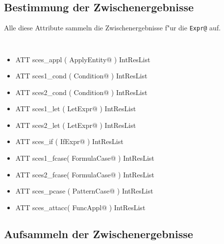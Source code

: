 \subsection{Bestimmung der Zwischenergebnisse}

Alle diese Attribute sammeln die Zwischenergebnisse f"ur die {\tt Expr@} auf.

{\tt
\begin{itemize}
\item ATT  sces\_appl  ( ApplyEntity@ ) IntResList 
\item ATT  sces1\_cond ( Condition@   ) IntResList 
\item ATT  sces2\_cond ( Condition@   ) IntResList 
\item ATT  sces1\_let  ( LetExpr@     ) IntResList 
\item ATT  sces2\_let  ( LetExpr@     ) IntResList 
\item ATT  sces\_if    ( IfExpr@      ) IntResList 
\item ATT  sces1\_fcase( FormulaCase@ ) IntResList 
\item ATT  sces2\_fcase( FormulaCase@ ) IntResList 
\item ATT  sces\_pcase ( PatternCase@ ) IntResList 
\item ATT  sces\_attacc( FuncAppl@    ) IntResList 
\end{itemize}
}

\subsection{Aufsammeln der Zwischenergebnisse}



